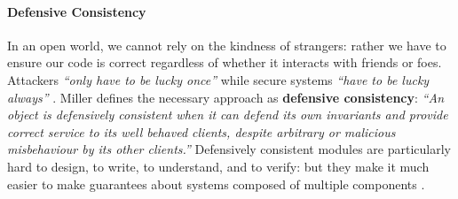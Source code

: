 
\paragraph{Defensive Consistency}


In an open world, we cannot rely on the kindness of strangers: rather
we have to ensure our code is correct regardless of whether it
interacts with friends or foes.
Attackers 
\textit{``only have to be lucky once''} while secure systems 
\textit{``have to be lucky always''} \cite{IRAThatcher}.
Miller \cite{miller-esop2013,MillerPhD} defines the necessary approach
as \textbf{defensive consistency}: \textit{``An object is defensively
  consistent when it can defend its own invariants and provide correct
  service to its well behaved clients, despite arbitrary or malicious
  misbehaviour by its other clients.''}  Defensively consistent
modules are particularly hard to design, to write, to understand, and
to verify: but
they make it much
easier to make guarantees about systems composed of multiple components
\cite{Murray10dphil}.


